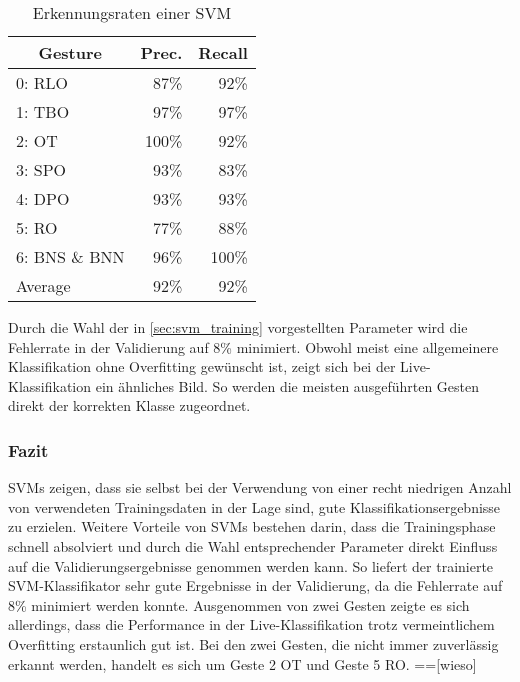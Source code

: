 \begin{table}[h]
\centering
\begin{tabular}{lrr}
\hline
 \multicolumn{1}{c}{\textbf{Gesture}} & \multicolumn{1}{c}{\textbf{Prec.}} & \multicolumn{1}{c}{\textbf{Recall}} \\
 \hline
  0: \ac{RLO} & 87\% & 92\% \\
 \hline
  1: \ac{TBO} & 97\% & 97\% \\
 \hline
  2: \ac{OT} & 100\% & 92\% \\
 \hline
  3: \ac{SPO} & 93\% & 83\% \\
 \hline
  4: \ac{DPO} & 93\% & 93\% \\
 \hline
  5: \ac{RO} & 77\% & 88\% \\
 \hline
  6: \ac{BNS} \& \ac{BNN} & 96\% & 100\% \\
 \hline
  Average & 92\% & 92\% \\
 \hline
\end{tabular}
\caption[Erkennungsraten einer SVM]{Erkennungsraten einer SVM}
\label{tab:svm_performance}
\end{table}

Durch die Wahl der in \autoref{sec:svm_training} vorgestellten Parameter wird die Fehlerrate in der Validierung auf 8\% minimiert.
Obwohl meist eine allgemeinere Klassifikation ohne Overfitting gewünscht ist, zeigt sich bei der Live-Klassifikation ein ähnliches Bild.
So werden die meisten ausgeführten Gesten direkt der korrekten Klasse zugeordnet.


\subsubsection{Fazit}\label{sec:svm_conclusion}
\ac{SVM}s zeigen, dass sie selbst bei der Verwendung von einer recht niedrigen Anzahl von verwendeten Trainingsdaten in der Lage sind, gute Klassifikationsergebnisse zu erzielen.
Weitere Vorteile von \ac{SVM}s bestehen darin, dass die Trainingsphase schnell absolviert und durch die Wahl entsprechender Parameter direkt Einfluss auf die Validierungsergebnisse genommen werden kann.
So liefert der trainierte \ac{SVM}-Klassifikator sehr gute Ergebnisse in der Validierung, da die Fehlerrate auf 8\% minimiert werden konnte.
Ausgenommen von zwei Gesten zeigte es sich allerdings, dass die Performance in der Live-Klassifikation trotz vermeintlichem Overfitting erstaunlich gut ist.
Bei den zwei Gesten, die nicht immer zuverlässig erkannt werden, handelt es sich um Geste 2 \ac{OT} und Geste 5 \ac{RO}.
==[wieso]


